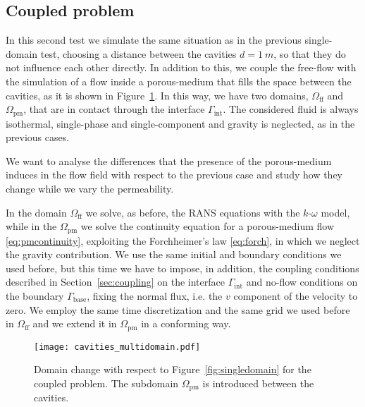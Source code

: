 \subsection{Coupled problem}
In this second test we simulate the same situation as in the previous 
single-domain test, 
choosing a distance between the cavities $d=\SI{1}{m}$, so that they do not influence each other directly. In addition to this, we couple the free-flow with the simulation of a flow inside a porous-medium that fills the space between 
the cavities, as it is shown in Figure~\ref{fig:multidomain}. In this way, we 
have two domains, $\Omega_\text{ff}$ and $\Omega_\text{pm}$, that are in contact through the 
interface $\Gamma_\text{int}$. The considered fluid is always isothermal, single-phase and single-component and gravity is neglected, as in the previous cases.

We want to analyse the differences that the presence of the porous-medium 
induces in the flow field with respect to the previous case and study how they 
change while we vary the permeability.

In the domain $\Omega_\text{ff}$ we solve, as before, the RANS equations with the 
$k\text{-}\omega$ model, while in the $\Omega_\text{pm}$ we solve the continuity equation
for a porous-medium flow \eqref{eq:pmcontinuity}, exploiting the Forchheimer's law \eqref{eq:forch}, in which we neglect the gravity contribution.
We use the same initial and boundary conditions we used before, but this time 
we have to impose, in addition, the coupling conditions described in 
Section~\ref{sec:coupling} on the interface 
$\Gamma_\text{int}$ and no-flow conditions on the boundary $\Gamma_\text{base}$, fixing the normal flux, i.e. the $v$ component of the velocity to zero.
We employ the same time discretization and the same grid we used before in $\Omega_\text{ff}$ and we extend it in 
$\Omega_\text{pm}$ in a conforming way.
\begin{figure}
	\centering
	\texttt{[image: cavities\_multidomain.pdf]}
	\caption[Domain change with respect to Figure~\ref{fig:singledomain} for the coupled problem]{Domain change with respect to Figure~\ref{fig:singledomain} for the coupled problem. The subdomain $\Omega_\text{pm}$ is introduced between the cavities.}
	\label{fig:multidomain}
\end{figure}

